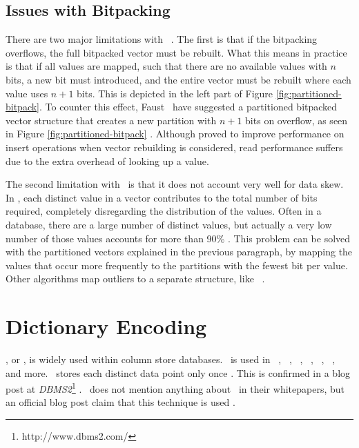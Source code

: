 \subsection{Issues with Bitpacking}
\label{sub:Issues with Bitpacking}
There are two major limitations with \bp~\cite{Faust2015-ke}. The first is that if the bitpacking overflows, the full bitpacked vector must be rebuilt. What this means in practice is that if all values are mapped, such that there are no available values with $n$ bits, a new bit must introduced, and the entire vector must be rebuilt where each value uses $n + 1$ bits. This is depicted in the left part of Figure \ref{fig:partitioned-bitpack}. To counter this effect, Faust \ea~have suggested a partitioned bitpacked vector structure that creates a new partition with $n + 1$ bits on overflow, as seen in Figure \ref{fig:partitioned-bitpack} \cite{Faust2015-ke}. Although proved to improve performance on insert operations when vector rebuilding is considered, read performance suffers due to the extra overhead of looking up a value.

The second limitation with \bp~is that it does not account very well for data skew. In \bp, each distinct value in a vector contributes to the total number of bits required, completely disregarding the distribution of the values. Often in a database, there are a large number of distinct values, but actually a very low number of those values accounts for more than 90\% \cite{Faust2015-ke}. This problem can be solved with the partitioned vectors explained in the previous paragraph, by mapping the values that occur more frequently to the partitions with the fewest bit per value. Other algorithms map outliers to a separate structure, like \pfdelta~\cite{Bjorklund2011-wh}.

\section{Dictionary Encoding}
\label{sec:Dictionary Encoding}
\de, or , is widely used within column store databases. \de~is used in \oracle~\cite{Lahiri2015-mz}, \ibm~\cite{Raman2013-em}, \saph~\cite{Farber2012-vh}, \sapnw~\cite{Lemke2010-is}, \blink~\cite{Johnson2008-cp}, \mssql~\cite{Larson2013-mc}, and more. \qlikview~stores each distinct data point only once \cite{Qlik2011-ef}. This is confirmed in a blog post at \textit{DBMS2}\footnote{http://www.dbms2.com/} \cite{noauthor_undated-js}. \tableau~does not mention anything about \de~in their whitepapers, but an official blog post claim that this technique is used \cite{noauthor_undated-us}.

